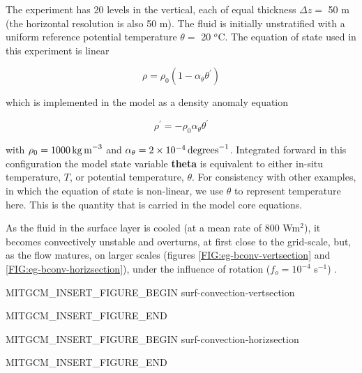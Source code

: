 The experiment has 20 levels in the vertical, each of equal thickness $\Delta z =$ 50
m (the horizontal resolution is also 50 m). The fluid is initially unstratified with a
uniform reference potential temperature $\theta = $ 20 $^o$C. The equation of state
used in this experiment is linear

\begin{equation}
\label{EQ:eg-bconv-linear1_eos}
\rho = \rho_{0} ( 1 - \alpha_{\theta}\theta^{'} )
\end{equation}

\noindent which is implemented in the model as a density anomaly equation

\begin{equation}
\label{EQ:eg-bconv-linear1_eos_pert}
\rho^{'} = -\rho_{0}\alpha_{\theta}\theta^{'}
\end{equation}

\noindent with $\rho_{0}=1000\,{\rm kg\,m}^{-3}$ and 
$\alpha_{\theta}=2\times10^{-4}\,{\rm degrees}^{-1} $. Integrated forward in
this configuration the model state variable {\bf theta} is equivalent to
either in-situ temperature, $T$, or potential temperature, $\theta$. For 
consistency with other examples, in which the equation of state is
non-linear, we use $\theta$ to represent temperature here. This is
the quantity that is carried in the model core equations.

As the fluid in the surface layer is cooled (at a mean rate of 800 Wm$^2$), it becomes 
convectively unstable and 
overturns, at first close to the grid-scale, but, as the flow matures, on larger scales 
(figures \ref{FIG:eg-bconv-vertsection} and \ref{FIG:eg-bconv-horizsection}), under the influence of 
rotation ($f_o = 10^{-4}$ s$^{-1}$) .

\begin{rawhtml}MITGCM_INSERT_FIGURE_BEGIN surf-convection-vertsection\end{rawhtml}
\begin{figure}
\begin{center}
\end{center}
\caption{
}
\label{FIG:eg-bconv-vertsection}
\label{fig:surf-convection-vertsection}
\end{figure}
\begin{rawhtml}MITGCM_INSERT_FIGURE_END\end{rawhtml}

\begin{rawhtml}MITGCM_INSERT_FIGURE_BEGIN surf-convection-horizsection\end{rawhtml}
\begin{figure}
\begin{center}
\end{center}
\caption{
}
\label{FIG:eg-bconv-horizsection}
\label{fig:surf-convection-horizsection}
\end{figure}
\begin{rawhtml}MITGCM_INSERT_FIGURE_END\end{rawhtml}

